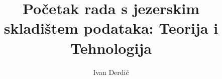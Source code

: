 \documentclass[times, utf8, seminar, numeric]{fer}
\begin{document}
\title{Početak rada s jezerskim skladištem podataka: Teorija i Tehnologija}

\author{Ivan Derdić}


\maketitle

\tableofcontents















\end{document}
